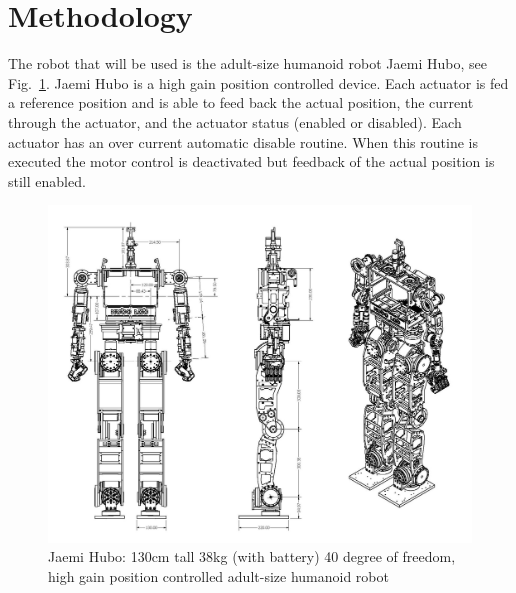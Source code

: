 \section{Methodology}

The robot that will be used is the adult-size humanoid robot Jaemi Hubo, see Fig.~\ref{fig:huboSch}.  Jaemi Hubo is a high gain position controlled device.  Each actuator is fed a reference position and is able to feed back the actual position, the current through the actuator, and the actuator status (enabled or disabled).  Each actuator has an over current automatic disable routine.  When this routine is executed the motor control is deactivated but feedback of the actual position is still enabled.

\begin{figure}[thpb]
  \centering
\includegraphics[width=1.0\columnwidth]{./pix/huboSch.png}
  \caption{Jaemi Hubo: 130cm tall 38kg (with battery) 40 degree of freedom, high gain position controlled adult-size humanoid robot }
  \label{fig:huboSch}
\end{figure}